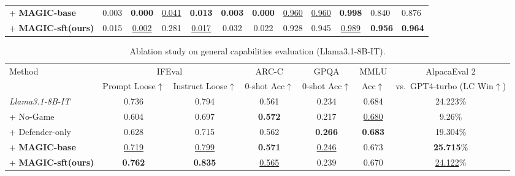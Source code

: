 \documentclass[11pt, letterpaper]{template}
\theoremstyle{plain}
\theoremstyle{definition}
\theoremstyle{remark}
\begin{document}
\begin{table}[ht]
\begin{tabular}{lccccccccc p{1.35cm} p{1.45cm}}
\quad + \textbf{MAGIC-base}
& 0.003 & \textbf{0.000} & \underline{0.041} & \textbf{0.013} & \textbf{0.003} & \textbf{0.000}
& \underline{0.960} & \underline{0.960} & \textbf{0.998}
& \cellcolor{green!15}0.840 & \cellcolor{green!15}0.876 \\

\quad + \textbf{MAGIC-sft(ours)}
& 0.015 & \underline{0.002} & 0.281 & \underline{0.017} & 0.032 & 0.022
& 0.928 & 0.945 & \underline{0.989}
& \textbf{0.956} & \textbf{0.964} \\

\bottomrule
\end{tabular}
\vspace{-0.6em}
\end{table}


\begin{table}[ht]
\centering
\caption{Ablation study on general capabilities evaluation (Llama3.1-8B-IT). }
\label{tab:llama8b_ablation_general}
\setlength{\tabcolsep}{4pt}
\renewcommand{\arraystretch}{1.12}
\scriptsize
\begin{tabular}{lcccccc}
\toprule
Method
& \multicolumn{2}{c}{IFEval}
& ARC-C
& GPQA
& MMLU
& AlpacaEval 2  \\
\cmidrule(lr){2-3}\cmidrule(lr){4-4}\cmidrule(lr){5-5}\cmidrule(lr){6-6}\cmidrule(lr){7-7}
& Prompt Loose$\uparrow$
& Instruct Loose$\uparrow$
& 0-shot Acc$\uparrow$
& 0-shot Acc$\uparrow$
& Acc$\uparrow$
& vs.\ GPT4-turbo (LC Win$\uparrow$) \\
\midrule
\textit{Llama3.1-8B-IT} &0.736&	0.794&	0.561&	0.234&0.684&24.223\% \\
\quad + No-Game &0.604 &0.697 &\textbf{0.572} &0.217 &\underline{0.680} &\cellcolor{green!15}9.26\% \\
\quad + Defender-only &0.628  &0.715  &0.562  &\textbf{0.266}  &\textbf{0.683}  &\cellcolor{green!15}19.304\%  \\
\quad + \textbf{MAGIC-base} &\underline{0.719}  &\underline{0.799}  &\textbf{0.571}  &\underline{0.246}  &0.673  &\textbf{25.715}\%   \\
\quad + \textbf{MAGIC-sft(ours)}& \textbf{0.762} & \textbf{0.835} &	\underline{0.565}&	0.239 & 0.670 &	\underline{24.122}\%  \\
\bottomrule
\end{tabular}
\vspace{-0.6em}
\end{table}
\end{document}
